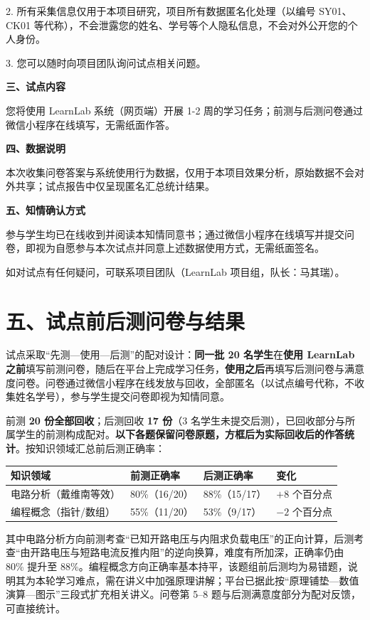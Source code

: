 \documentclass[zihao=-4,a4paper,UTF8,fontset=windows]{ctexart}
\begin{document}
2. 所有采集信息仅用于本项目研究，项目所有数据匿名化处理（以编号 SY01、CK01 等代称），不会泄露您的姓名、学号等个人隐私信息，不会对外公开您的个人身份。

3. 您可以随时向项目团队询问试点相关问题。

\textbf{三、试点内容}

您将使用 LearnLab 系统（网页端）开展 1-2 周的学习任务；前测与后测问卷通过微信小程序在线填写，无需纸面作答。

\textbf{四、数据说明}

本次收集问卷答案与系统使用行为数据，仅用于本项目效果分析，原始数据不会对外共享；试点报告中仅呈现匿名汇总统计结果。

\textbf{五、知情确认方式}

参与学生均已在线收到并阅读本知情同意书；通过微信小程序在线填写并提交问卷，即视为自愿参与本次试点并同意上述数据使用方式，无需纸面签名。

如对试点有任何疑问，可联系项目团队（LearnLab 项目组，队长：马其瑞）。

\section{五、试点前后测问卷与结果}

试点采取“先测—使用—后测”的配对设计：\textbf{同一批 20 名学生}在\textbf{使用 LearnLab 之前}填写前测问卷，随后在平台上完成学习任务，\textbf{使用之后}再填写后测问卷与满意度问卷。问卷通过微信小程序在线发放与回收，全部匿名（以试点编号代称，不收集姓名学号），参与学生提交问卷即视为知情同意。

前测 \textbf{20 份全部回收}；后测回收 \textbf{17 份}（3 名学生未提交后测），已回收部分与所属学生的前测构成配对。\textbf{以下各题保留问卷原题，方框后为实际回收后的作答统计}。按知识领域汇总前后测正确率：

\par\noindent\begin{tabular}{|p{4.6cm}|p{2.8cm}|p{2.8cm}|p{2.6cm}|}
\hline
\textbf{知识领域} & \textbf{前测正确率} & \textbf{后测正确率} & \textbf{变化} \\ \hline
电路分析（戴维南等效） & 80\%（16/20） & 88\%（15/17） & ${+}8$ 个百分点 \\ \hline
编程概念（指针/数组） & 55\%（11/20） & 53\%（9/17） & ${-}2$ 个百分点 \\ \hline
\end{tabular}\par

其中电路分析方向前测考查“已知开路电压与内阻求负载电压”的正向计算，后测考查“由开路电压与短路电流反推内阻”的逆向换算，难度有所加深，正确率仍由 80\% 提升至 88\%。编程概念方向正确率基本持平，该题组前后测均为易错题，说明其为本轮学习难点，需在讲义中加强原理讲解；平台已据此按“原理铺垫—数值演算—图示”三段式扩充相关讲义。问卷第 5--8 题与后测满意度部分为配对反馈，可直接统计。
\end{document}
